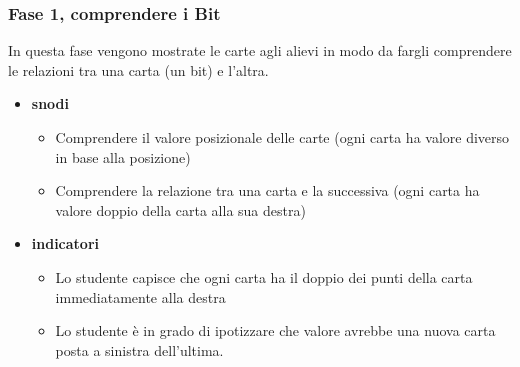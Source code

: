 \documentclass[a4paper]{article}
\begin{document}
\subsubsection{Fase 1, comprendere i Bit}
In questa fase vengono mostrate le carte agli alievi in modo da fargli comprendere le relazioni tra una carta (un bit) e l'altra.
\begin{itemize}
	\item \textbf{snodi}
		\begin{itemize}[label={--}]
			\item Comprendere il valore posizionale delle carte (ogni carta ha valore diverso in base alla posizione)
			\item Comprendere la relazione tra una carta e la successiva (ogni carta ha valore doppio della carta alla sua destra)
		\end{itemize}
	\item \textbf{indicatori}
		\begin{itemize}[label={--}]
			\item Lo studente capisce che ogni carta ha il doppio dei punti della carta immediatamente alla destra
			\item Lo studente è in grado di ipotizzare che valore avrebbe una nuova carta posta a sinistra dell'ultima.
		\end{itemize}

\end{itemize}
\end{document}
